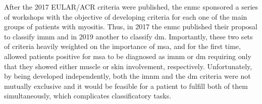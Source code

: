 After the 2017 EULAR/ACR criteria were published, the \gls{enmc} sponsored a series of workshops with the objective of developing criteria for each one of the main groups of patients with myositis. Thus, in 2017 the \gls{enmc} published their proposal to classify \gls{imnm}\cite{Allenbach2017} and in 2019 another to classify \gls{dm}.\cite{Mammen2020} Importantly, these two sets of criteria heavily weighted on the importance of \gls{msa}, and for the first time, allowed patients positive for \gls{msa} to be diagnosed as \gls{imnm} or \gls{dm} requiring only that they showed either muscle or skin involvement, respectively. Unfortunately, by being developed independently, both the \gls{imnm} and the \gls{dm} criteria were not mutually exclusive and it would be feasible for a patient to fulfill both of them simultaneously, which complicates classificatory tasks.

